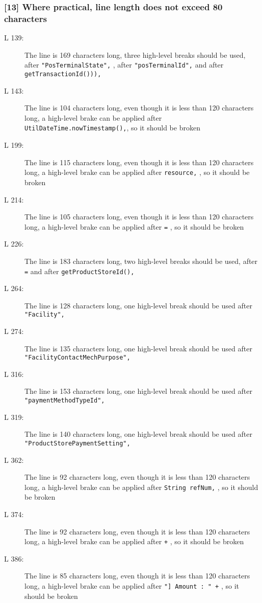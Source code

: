 \subsubsection*{[13] Where practical, line length does not exceed 80 characters}\label{subsec:lineLen}
\begin{description}
	\item[L 139:] The line is 169 characters long, three high-level breaks should be used, after {\tt "PosTerminalState",} , after {\tt "posTerminalId",} and after {\tt getTransactionId())),}
	\item[L 143:] The line is 104 characters long, even though it is less than 120 characters long, a high-level brake can be applied after {\tt UtilDateTime.nowTimestamp(),}, so it should be broken
	\item[L 199:] The line is 115 characters long, even though it is less than 120 characters long, a high-level brake can be applied after {\tt resource,} , so it should be broken
	\item[L 214:] The line is 105 characters long, even though it is less than 120 characters long, a high-level brake can be applied after {\tt =} , so it should be broken
	\item[L 226:] The line is 183 characters long, two high-level breaks should be used, after {\tt =} and after {\tt getProductStoreId(),}
	\item[L 264:] The line is 128 characters long, one high-level break should be used after {\tt "Facility",} 
	\item[L 274:] The line is 135 characters long, one high-level break should be used after {\tt "FacilityContactMechPurpose",} 
	\item[L 316:] The line is 153 characters long, one high-level break should be used after {\tt "paymentMethodTypeId",}
	\item[L 319:] The line is 140 characters long, one high-level break should be used after {\tt "ProductStorePaymentSetting",}
	\item[L 362:] The line is 92 characters long, even though it is less than 120 characters long, a high-level brake can be applied after {\tt String refNum,} , so it should be broken
	\item[L 374:] The line is 92 characters long, even though it is less than 120 characters long, a high-level brake can be applied after {\tt +} , so it should be broken
	\item[L 386:] The line is 85 characters long, even though it is less than 120 characters long, a high-level brake can be applied after {\tt "] Amount : " +} , so it should be broken

\end{description}
